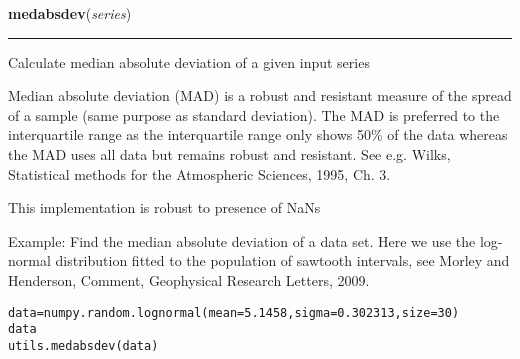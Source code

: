 \hspace{.8\funcindent}\begin{boxedminipage}{\funcwidth}

    \raggedright \textbf{medabsdev}(\textit{series})

    \vspace{-1.5ex}

    \rule{\textwidth}{0.5\fboxrule}
\setlength{\parskip}{2ex}
    Calculate median absolute deviation of a given input series

    Median absolute deviation (MAD) is a robust and resistant measure of 
    the spread of a sample (same purpose as standard deviation). The MAD is
    preferred to the interquartile range as the interquartile range only 
    shows 50\% of the data whereas the MAD uses all data but remains robust
    and resistant. See e.g. Wilks, Statistical methods for the Atmospheric 
    Sciences, 1995, Ch. 3.

    This implementation is robust to presence of NaNs

    Example: Find the median absolute deviation of a data set. Here we use 
    the log- normal distribution fitted to the population of sawtooth 
    intervals, see Morley and Henderson, Comment, Geophysical Research 
    Letters, 2009.

\begin{alltt}
\pysrcprompt{{\textgreater}{\textgreater}{\textgreater} }data = numpy.random.lognormal(mean=5.1458, sigma=0.302313, size=30)
\pysrcprompt{{\textgreater}{\textgreater}{\textgreater} } data
\pysrcoutput{}\pysrcprompt{{\textgreater}{\textgreater}{\textgreater} }utils.medabsdev(data)
\end{alltt}
\setlength{\parskip}{1ex}
    \end{boxedminipage}

    \label{spacepy:utils:makePoly}

    \vspace{0.5ex}

